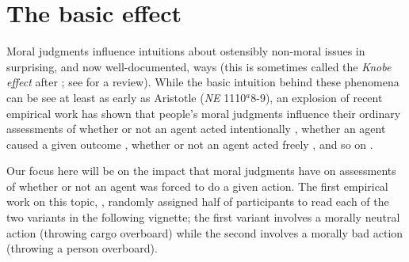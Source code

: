 \documentclass{salt}
\begin{document}

\section{The basic effect}

Moral judgments influence intuitions about ostensibly non-moral issues in surprising, and now well-documented, ways (this is sometimes called the \emph{Knobe effect} after \citealt{knobe2003intentional}; see \citeyear{knobe2010person} for a review). While the basic intuition behind these phenomena can be see at least as early as Aristotle (\textit{NE} 1110$^a$8-9), an explosion of recent empirical work has shown that people's moral judgments influence their ordinary assessments of whether or not an agent acted intentionally \citep{knobe2003intentional,leslie2006acting,cova2015intentional}, whether an agent caused a given outcome \citep{alicke1992culpable,knobe2008causal, hitchcock2009cause}, whether or not an agent acted freely \citep{phillips2009moral}, and so on \citep{pettit2009pervasive,phillips2015unifying}.

Our focus here will be on the impact that moral judgments have on assessments of whether or not an agent was forced to do a given action. The first empirical work on this topic, \citealt{phillips2009moral}, randomly assigned half of participants to read each of the two variants in the following vignette; the first variant involves a morally neutral action (throwing cargo overboard) while the second involves a morally bad action (throwing a person overboard).
\end{document}
